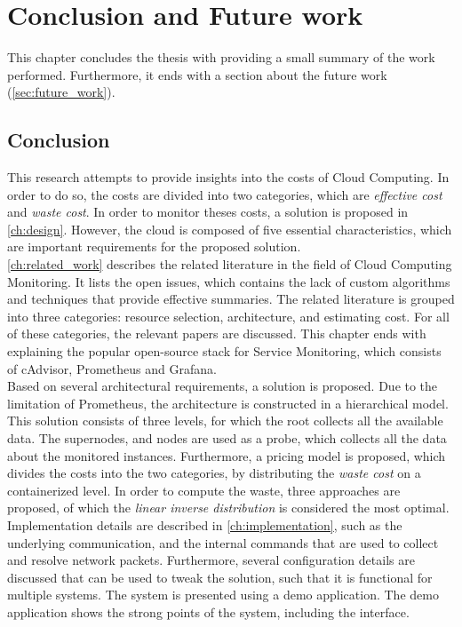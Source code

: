 \chapter{Conclusion and Future work}\label{ch:conclusion}
This chapter concludes the thesis with providing a small summary of the work performed. Furthermore, it ends with a section about the future work (\autoref{sec:future_work}).

\section{Conclusion}
This research attempts to provide insights into the costs of Cloud Computing. In order to do so, the costs are divided into two categories, which are \textit{effective cost} and \textit{waste cost}. In order to monitor theses costs, a solution is proposed in \autoref{ch:design}. However, the cloud is composed of five essential characteristics, which are important requirements for the proposed solution.\\

\noindent
\autoref{ch:related_work} describes the related literature in the field of Cloud Computing Monitoring. It lists the open issues, which contains the lack of custom algorithms and techniques that provide effective summaries. The related literature is grouped into three categories: resource selection, architecture, and estimating cost. For all of these categories, the relevant papers are discussed. This chapter ends with explaining the popular open-source stack for Service Monitoring, which consists of cAdvisor, Prometheus and Grafana.\\

\noindent
Based on several architectural requirements, a solution is proposed. Due to the limitation of Prometheus, the architecture is constructed in a hierarchical model. This solution consists of three levels, for which the root collects all the available data. The supernodes, and nodes are used as a probe, which collects all the data about the monitored instances. Furthermore, a pricing model is proposed, which divides the costs into the two categories, by distributing the \textit{waste cost} on a containerized level. In order to compute the waste, three approaches are proposed, of which the \textit{linear inverse distribution} is considered the most optimal.\\

\noindent
Implementation details are described in \autoref{ch:implementation}, such as the underlying communication, and the internal commands that are used to collect and resolve network packets. Furthermore, several configuration details are discussed that can be used to tweak the solution, such that it is functional for multiple systems. The system is presented using a demo application. The demo application shows the strong points of the system, including the interface.\\

